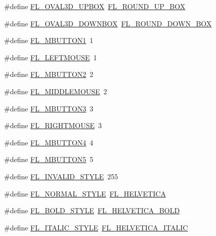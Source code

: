 \begin{DoxyCompactItemize}
\item 
\#define \hyperlink{forms_8_h_a03b9b4d6c5499f53bf6662178c54d00d}{F\+L\+\_\+\+O\+V\+A\+L3\+D\+\_\+\+U\+P\+B\+OX}~\hyperlink{_enumerations_8_h_a7d2ffbfc7801c6f04562fc18e53b9cd4}{F\+L\+\_\+\+R\+O\+U\+N\+D\+\_\+\+U\+P\+\_\+\+B\+OX}
\item 
\#define \hyperlink{forms_8_h_ae3b1910b4ca74945bd82a7422728c84c}{F\+L\+\_\+\+O\+V\+A\+L3\+D\+\_\+\+D\+O\+W\+N\+B\+OX}~\hyperlink{_enumerations_8_h_a792a19a6999cf43f93a7895e891d40a9}{F\+L\+\_\+\+R\+O\+U\+N\+D\+\_\+\+D\+O\+W\+N\+\_\+\+B\+OX}
\item 
\#define \hyperlink{forms_8_h_ab1f7431e9a15e5ca42fdf7d54ea6fbaf}{F\+L\+\_\+\+M\+B\+U\+T\+T\+O\+N1}~1
\item 
\#define \hyperlink{forms_8_h_a69335bd2539dbba48f65693d3ea4da94}{F\+L\+\_\+\+L\+E\+F\+T\+M\+O\+U\+SE}~1
\item 
\#define \hyperlink{forms_8_h_a327993835a8047481013423d4eeaee7b}{F\+L\+\_\+\+M\+B\+U\+T\+T\+O\+N2}~2
\item 
\#define \hyperlink{forms_8_h_afea823829985de627ef4fa1a041db89b}{F\+L\+\_\+\+M\+I\+D\+D\+L\+E\+M\+O\+U\+SE}~2
\item 
\#define \hyperlink{forms_8_h_abb4a8b58ec192c82e6dd566a7f820f9d}{F\+L\+\_\+\+M\+B\+U\+T\+T\+O\+N3}~3
\item 
\#define \hyperlink{forms_8_h_af384f70bc39039157f1d0ddde4beb130}{F\+L\+\_\+\+R\+I\+G\+H\+T\+M\+O\+U\+SE}~3
\item 
\#define \hyperlink{forms_8_h_a810240ef42de3eec08ca7145922dfe4b}{F\+L\+\_\+\+M\+B\+U\+T\+T\+O\+N4}~4
\item 
\#define \hyperlink{forms_8_h_a1dd69df69d66bdd708d9bf802109f07a}{F\+L\+\_\+\+M\+B\+U\+T\+T\+O\+N5}~5
\item 
\#define \hyperlink{forms_8_h_af99e27596e12d0d9f9dd8594ea247fea}{F\+L\+\_\+\+I\+N\+V\+A\+L\+I\+D\+\_\+\+S\+T\+Y\+LE}~255
\item 
\#define \hyperlink{forms_8_h_ae6bbc6e4a17fee7d0cd30d695e2542a3}{F\+L\+\_\+\+N\+O\+R\+M\+A\+L\+\_\+\+S\+T\+Y\+LE}~\hyperlink{_enumerations_8_h_a74d2c443f7ab53a6ce5d4ca0c7461bc9}{F\+L\+\_\+\+H\+E\+L\+V\+E\+T\+I\+CA}
\item 
\#define \hyperlink{forms_8_h_af2f9bb8146f07081dc54368860032bba}{F\+L\+\_\+\+B\+O\+L\+D\+\_\+\+S\+T\+Y\+LE}~\hyperlink{_enumerations_8_h_ae52b5d98292bf142ea1c7468d7d732cd}{F\+L\+\_\+\+H\+E\+L\+V\+E\+T\+I\+C\+A\+\_\+\+B\+O\+LD}
\item 
\#define \hyperlink{forms_8_h_a8ede57bbc3a8fbe82cf4942dda6b7f17}{F\+L\+\_\+\+I\+T\+A\+L\+I\+C\+\_\+\+S\+T\+Y\+LE}~\hyperlink{_enumerations_8_h_a384a459d931aaf8140cd84034a5887dd}{F\+L\+\_\+\+H\+E\+L\+V\+E\+T\+I\+C\+A\+\_\+\+I\+T\+A\+L\+IC}

\end{DoxyCompactItemize}
